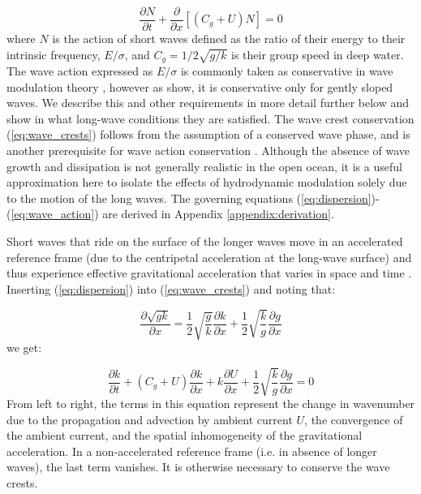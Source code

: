 \documentclass[lineno]{jfm}
\begin{document}
\begin{equation}
\label{eq:wave_action}
\dfrac{\partial N}{\partial t}
+ \dfrac{\partial}{\partial x} \left[\left(C_g + U\right)N\right]
= 0
\end{equation}
where $N$ is the action of short waves defined as the ratio of their
energy to their intrinsic frequency, $E/\sigma$,
and $C_g = 1/2\sqrt{g/k}$ is their group speed in deep water.
The wave action expressed as $E/\sigma$ is commonly taken as
conservative in wave modulation theory
\citep{phillips1981dispersion,longuet1987propagation}, however as
\citet{dysthe1988orbiting} show, it is conservative only for gently sloped waves.
We describe this and other requirements in more detail further below and show
in what long-wave conditions they are satisfied.
The wave crest conservation (\ref{eq:wave_crests}) follows from the assumption
of a conserved wave phase, and is another prerequisite for wave action
conservation \citep[e.g.,][]{whitham1974dispersive}.
Although the absence of wave growth and dissipation is not generally realistic in
the open ocean, it is a useful approximation here to isolate the effects
of hydrodynamic modulation solely due to the motion of the long waves.
The governing equations (\ref{eq:dispersion})-(\ref{eq:wave_action}) are
derived in Appendix \ref{appendix:derivation}.

Short waves that ride on the surface of the longer waves move in an accelerated
reference frame (due to the centripetal acceleration at the long-wave surface)
and thus experience effective gravitational acceleration that varies in space
and time \citep{phillips1981dispersion,longuet1986eulerian,longuet1987propagation}.
Inserting (\ref{eq:dispersion}) into (\ref{eq:wave_crests}) and noting that:

\begin{equation}
\label{eq:dispersion_derivative}
\dfrac{\partial \sqrt{gk}}{\partial x} =
\dfrac{1}{2} \sqrt{\dfrac{g}{k}} \dfrac{\partial k}{\partial x} + \dfrac{1}{2} \sqrt{\dfrac{k}{g}} \dfrac{\partial g}{\partial x}
\end{equation}
we get:

\begin{equation}
\label{eq:wavenumber}
\dfrac{\partial k}{\partial t}
+ \left(C_g + U\right) \dfrac{\partial k}{\partial x}
+ k \dfrac{\partial U}{\partial x}
+ \dfrac{1}{2} \sqrt{\dfrac{k}{g}} \dfrac{\partial g}{\partial x}
= 0
\end{equation}
From left to right, the terms in this equation represent the change in wavenumber
due to the propagation and advection by ambient current $U$, the convergence of
the ambient current, and the spatial inhomogeneity of the gravitational acceleration.
In a non-accelerated reference frame (i.e. in absence of longer waves), the last
term vanishes.
It is otherwise necessary to conserve the wave crests.
\end{document}
